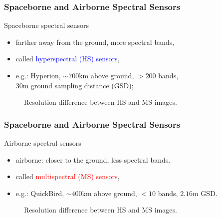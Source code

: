 \documentclass[10pt,mathserif]{beamer}
\begin{document}
    \begin{frame}
        \frametitle{Spaceborne and Airborne Spectral Sensors}
        Spaceborne spectral sensors
        \begin{itemize}
            \item farther away from the ground, more spectral bands,
            \item called \textcolor{blue}{hyperspectral (HS) sensors},
            \item e.g.: Hyperion, $\sim 700$km above ground, $> 200$ bands,\\
                  \hspace{0.6cm} \;$30$m ground sampling distance (GSD);
        \end{itemize}
        \begin{figure}
            \caption{Resolution difference between HS and MS images.}
        \end{figure}
    \end{frame}
    \begin{frame}
        \frametitle{Spaceborne and Airborne Spectral Sensors}
        Airborne spectral sensors
        \begin{itemize}
            \item airborne: closer to the ground, less spectral bands.
            \item called \textcolor{red}{multispectral (MS) sensors},
            \item e.g.: QuickBird, $\sim 400$km above ground, $< 10$ bands, $2.16$m GSD.
        \end{itemize}
        \begin{figure}
            \caption{Resolution difference between HS and MS images.}
        \end{figure}
    \end{frame}
\end{document}
